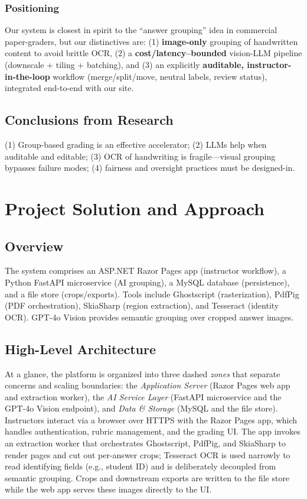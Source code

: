 \documentclass[ms,twoside,print]{nuthesis}
\begin{document}
\subsection{Positioning}
Our system is closest in spirit to the \enquote{answer grouping} idea in commercial paper-graders, but
our distinctives are: (1) \textbf{image-only} grouping of handwritten content to avoid brittle OCR,
(2) a \textbf{cost/latency–bounded} vision-LLM pipeline (downscale + tiling + batching), and
(3) an explicitly \textbf{auditable, instructor-in-the-loop} workflow (merge/split/move, neutral labels,
review status), integrated end-to-end with our site.

\section{Conclusions from Research}
(1) Group-based grading is an effective accelerator; (2) LLMs help when auditable and editable; (3) OCR of handwriting is fragile—visual grouping bypasses failure modes; (4) fairness and oversight practices must be designed-in.

\chapter{Project Solution and Approach}\label{chap:solution}

\section{Overview}
The system comprises an ASP.NET Razor Pages app (instructor workflow), a Python FastAPI microservice (AI grouping), a MySQL database (persistence), and a file store (crops/exports). Tools include Ghostscript (rasterization), PdfPig (PDF orchestration), SkiaSharp (region extraction), and Tesseract (identity OCR). GPT-4o Vision provides semantic grouping over cropped answer images.

\section{High-Level Architecture}
At a glance, the platform is organized into three dashed \emph{zones} that separate concerns and scaling boundaries: the \emph{Application Server} (Razor Pages web app and extraction worker), the \emph{AI Service Layer} (FastAPI microservice and the GPT-4o Vision endpoint), and \emph{Data \& Storage} (MySQL and the file store). Instructors interact via a browser over HTTPS with the Razor Pages app, which handles authentication, rubric management, and the grading UI. The app invokes an extraction worker that orchestrates Ghostscript, PdfPig, and SkiaSharp to render pages and cut out per-answer crops; Tesseract OCR is used narrowly to read identifying fields (e.g., student ID) and is deliberately decoupled from semantic grouping. Crops and downstream exports are written to the file store while the web app serves these images directly to the UI.
\end{document}
